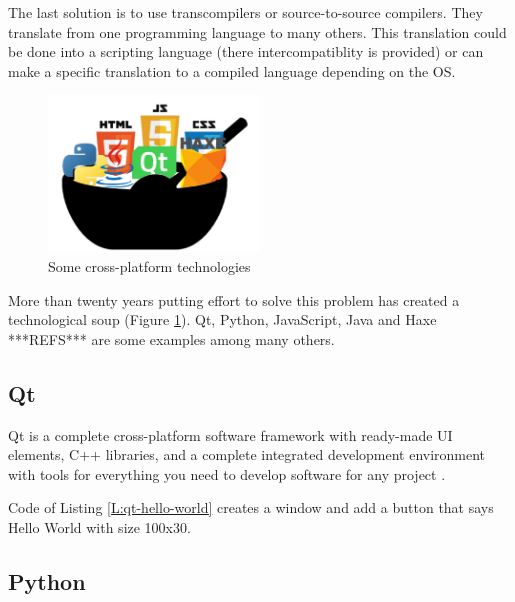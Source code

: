 The last solution is to use transcompilers or source-to-source compilers.
They translate from one programming language to many others. This translation
could be done into a scripting language (there intercompatiblity is provided) or
can make a specific translation to a compiled language depending on the OS.

\begin{figure}[htb]
	\begin{center}
		\includegraphics[width=0.5\textwidth]{./figures/techsoup.png}
		\caption{Some cross-platform technologies}
		\label{F:tech-soup}
	\end{center}
\end{figure}

More than twenty years putting effort to solve this problem has created a 
technological soup (Figure \ref{F:tech-soup}). Qt, Python, JavaScript, Java and 
Haxe ***REFS*** are some examples among many others.

\subsection{Qt}

Qt is a complete cross-platform software framework with ready-made UI elements,
C++ libraries, and a complete integrated development environment with tools for 
everything you need to develop software for any project \cite{qt-web}.

\begin{codefigure}
\end{codefigure}

Code of Listing \ref{L:qt-hello-world} creates a window and add a button that
says Hello World with size 100x30.

\subsection{Python}

